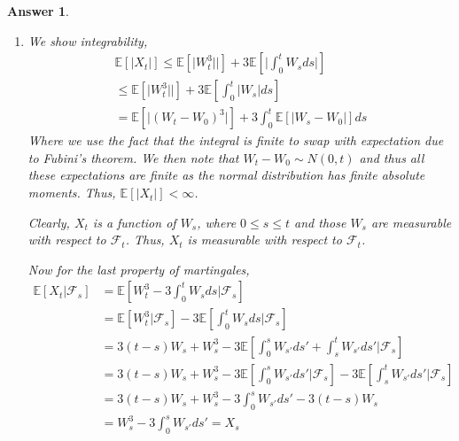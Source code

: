\documentclass[12pt]{article}
\theoremstyle{colon}
\newtheorem*{answer}{Answer}
\begin{document}
\begin{answer}
\begin{enumerate}[label=\alph*)]
      \begin{gather*}
        \mathbb{E} \left[ \int_s^t W_u du | \mathcal{F}_s \right] = \int_s^t \mathbb{E}[W_u | \mathcal{F}_s] du \\
        = \int_s^t W_s du = W_s \int_s^t du = W_s (t-s)
      \end{gather*}
    \item We show integrability,
      \begin{gather*}
        \mathbb{E}[\lvert X_t \rvert] \leq \mathbb{E}[\lvert W_t^3 \rvert | ] + 3 \mathbb{E} \left[ \lvert \int_0^t W_s ds \rvert \right] \\
        \leq \mathbb{E}[\lvert W_t^3 \rvert | ] + 3 \mathbb{E} \left[ \int_0^t \lvert W_s \rvert ds \right] \\
        = \mathbb{E}[\lvert (W_t - W_0)^3 \rvert ]+ 3 \int_0^t \mathbb{E}[ \lvert W_s - W_0\rvert] ds
      \end{gather*}
      Where we use the fact that the integral is finite to swap with expectation due to Fubini's theorem. We then note that $W_t - W_0 \sim N(0,t)$ and thus all these expectations are finite as the normal distribution has finite absolute moments. Thus, $\mathbb{E}[\lvert X_t \rvert] < \infty$.

      Clearly, $X_t$ is a function of $W_s$, where $0 \leq s \leq t$ and those $W_s$ are measurable with respect to $\mathcal{F}_t$. Thus, $X_t$ is measurable with respect to $\mathcal{F}_t$.

      Now for the last property of martingales,
      \begin{align*}
        \mathbb{E}[X_t | \mathcal{F}_s] &= \mathbb{E} \left[ W_t^3 - 3 \int_0^t W_s ds | \mathcal{F}_s \right] \\
        &= \mathbb{E}[W_t^3| \mathcal{F}_s] - 3 \mathbb{E} \left[ \int_0^t W_s ds | \mathcal{F}_s \right] \\
        &= 3(t-s)W_s + W_s^3 - 3\mathbb{E} \left[ \int_0^s W_{s'} ds' + \int_s^t W_{s'} ds' | \mathcal{F}_s \right] \\
        &= 3(t-s)W_s + W_s^3 - 3\mathbb{E} \left[ \int_0^s W_{s'} ds'| \mathcal{F}_s \right] -3\mathbb{E} \left[ \int_s^t W_{s'} ds' | \mathcal{F}_s \right] \\
        &= 3(t-s)W_s + W_s^3 - 3\int_0^s W_{s'} ds' -3(t-s)W_s \\
        &= W_s^3 - 3\int_0^s W_{s'} ds' = X_s
      \end{align*}
  \end{enumerate}
\end{answer}
\end{document}
